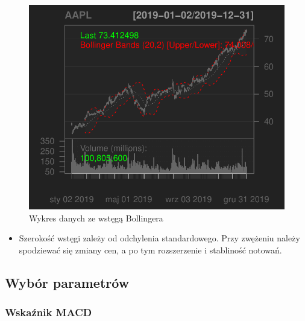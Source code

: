 \documentclass[12pt, a4paper]{article}\usepackage[]{graphicx}\usepackage[]{color}
\makeatletter
\def\maxwidth{ %
  \ifdim\Gin@nat@width>\linewidth
    \linewidth
  \else
    \Gin@nat@width
  \fi
}
\newenvironment{knitrout}{}{} %
\makeatother
\begin{document}
\begin{knitrout}
\begin{figure}[H]
{\centering \includegraphics[width=\maxwidth]{figure/unnamed-chunk-5-2} 

}

\caption[Wykres danych ze wstęgą Bollingera]{Wykres danych ze wstęgą Bollingera}\label{fig:unnamed-chunk-5-2}
\end{figure}

\end{knitrout}


\begin{itemize}

\item Szerokość wstęgi zależy od odchylenia standardowego. Przy zwężeniu należy spodziewać się zmiany cen, a po tym rozszerzenie i stabliność notowań.

\end{itemize}

\subsection{Wybór parametrów}

\subsubsection{Wskaźnik MACD}
\end{document}
